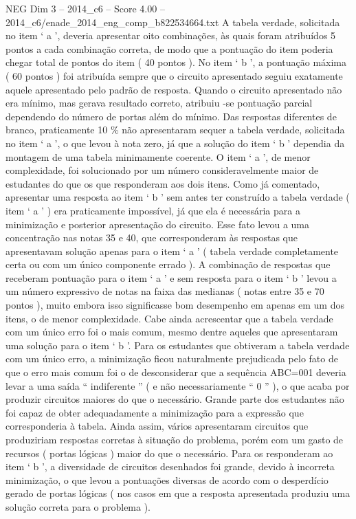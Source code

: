 \begin{textsample}{NEG Dim 3 – 2014\_c6 – Score 4.00 – 2014\_c6/enade\_2014\_eng\_comp\_b822534664.txt}
A tabela verdade, solicitada no item ‘ a ’, deveria apresentar oito combinações, às quais foram atribuídos 5 pontos a cada combinação correta, de modo que a pontuação do item poderia chegar total de pontos do item ( 40 pontos ).
No item ‘ b ’, a pontuação máxima ( 60 pontos ) foi atribuída sempre que o circuito apresentado seguiu exatamente aquele apresentado pelo padrão de resposta.
Quando o circuito apresentado não era mínimo, mas gerava resultado correto, atribuiu -se pontuação parcial dependendo do número de portas além do mínimo.
Das respostas diferentes de branco, praticamente 10 \% não apresentaram sequer a tabela verdade, solicitada no item ‘ a ’, o que levou à nota zero, já que a solução do item ‘ b ’ dependia da montagem de uma tabela minimamente coerente.
O item ‘ a ’, de menor complexidade, foi solucionado por um número consideravelmente maior de estudantes do que os que responderam aos dois itens.
Como já comentado, apresentar uma resposta ao item ‘ b ’ sem antes ter construído a tabela verdade ( item ‘ a ’ ) era praticamente impossível, já que ela é necessária para a minimização e posterior apresentação do circuito.
Esse fato levou a uma concentração nas notas 35 e 40, que corresponderam às respostas que apresentavam solução apenas para o item ‘ a ’ ( tabela verdade completamente certa ou com um único componente errado ).
A combinação de respostas que receberam pontuação para o item ‘ a ’ e sem resposta para o item ‘ b ’ levou a um número expressivo de notas na faixa das medianas ( notas entre 35 e 70 pontos ), muito embora isso significasse bom desempenho em apenas em um dos itens, o de menor complexidade.
Cabe ainda acrescentar que a tabela verdade com um único erro foi o mais comum, mesmo dentre aqueles que apresentaram uma solução para o item ‘ b ’.
Para os estudantes que obtiveram a tabela verdade com um único erro, a minimização ficou naturalmente prejudicada pelo fato de que o erro mais comum foi o de desconsiderar que a sequência ABC=001 deveria levar a uma saída “ indiferente ” ( e não necessariamente “ 0 ” ), o que acaba por produzir circuitos maiores do que o necessário.
Grande parte dos estudantes não foi capaz de obter adequadamente a minimização para a expressão que corresponderia à tabela.
Ainda assim, vários apresentaram circuitos que produziriam respostas corretas à situação do problema, porém com um gasto de recursos ( portas lógicas ) maior do que o necessário.
Para os responderam ao item ‘ b ’, a diversidade de circuitos desenhados foi grande, devido à incorreta minimização, o que levou a pontuações diversas de acordo com o desperdício gerado de portas lógicas ( nos casos em que a resposta apresentada produziu uma solução correta para o problema ).

\end{textsample}
